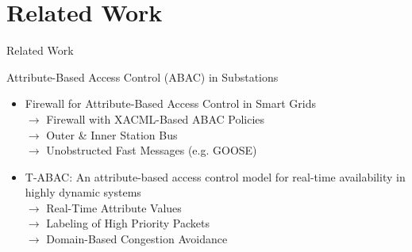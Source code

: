 \documentclass[en]{sdqbeamer}
\begin{document}
\section{Related Work}
\begin{frame}{Related Work}
    \begin{blueblock}{Attribute-Based Access Control (ABAC) in Substations}
        \begin{itemize}
            \item Firewall for Attribute-Based Access Control in Smart Grids \parencite{Ruland2018}
            \\$\rightarrow$ Firewall with XACML-Based ABAC Policies
            \\$\rightarrow$ Outer \& Inner Station Bus
            \\$\rightarrow$ Unobstructed Fast Messages (e.g. GOOSE)
            \item T-ABAC: An attribute-based access control model for real-time availability in highly dynamic systems \parencite{Burmester2013}
            \\$\rightarrow$ Real-Time Attribute Values
            \\$\rightarrow$ Labeling of High Priority Packets
            \\$\rightarrow$ Domain-Based Congestion Avoidance
        \end{itemize}
    \end{blueblock}
\end{frame}
\end{document}
